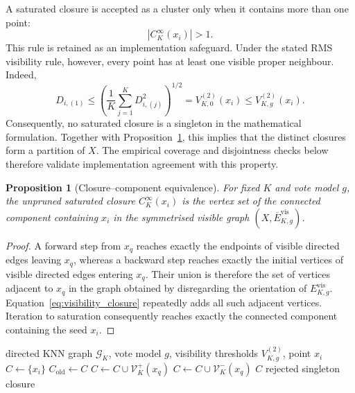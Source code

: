 \documentclass[pdflatex,sn-basic,Numbered]{sn-jnl}
\newtheorem{proposition}[theorem]{Proposition}
\newcommand{\calG}{\mathcal{G}}
\newcommand{\calV}{\mathcal{V}}
\begin{document}
A saturated closure is accepted as a cluster only when it contains more than
one point:
\begin{equation}
|C_K^\infty(x_i)|>1.
\label{eq:singleton_rejection}
\end{equation}
This rule is retained as an implementation safeguard. Under the stated
RMS visibility rule, however, every point has at least one visible proper
neighbour. Indeed,
\begin{equation}
D_{i,(1)}\leq
\left(\frac{1}{K}\sum_{j=1}^{K}D_{i,(j)}^2\right)^{1/2}
=V_{K,0}^{(2)}(x_i)\leq V_{K,g}^{(2)}(x_i).
\label{eq:nonempty_visible_neighbourhood}
\end{equation}
Consequently, no saturated closure is a singleton in the mathematical
formulation. Together with Proposition~\ref{prop:closure_component}, this
implies that the distinct closures form a partition of $X$. The empirical
coverage and disjointness checks below therefore validate implementation
agreement with this property.

\begin{proposition}[Closure--component equivalence]
\label{prop:closure_component}
For fixed $K$ and vote model $g$, the unpruned saturated closure
$C_K^\infty(x_i)$ is the vertex set of the connected component containing
$x_i$ in the symmetrised visible graph
$(X,\overline E^{\mathrm{vis}}_{K,g})$.
\end{proposition}

\begin{proof}
A forward step from $x_q$ reaches exactly the endpoints of visible directed
edges leaving $x_q$, whereas a backward step reaches exactly the initial
vertices of visible directed edges entering $x_q$. Their union is therefore
the set of vertices adjacent to $x_q$ in the graph obtained by disregarding
the orientation of $E^{\mathrm{vis}}_{K,g}$.
Equation~\eqref{eq:visibility_closure} repeatedly adds all such adjacent
vertices. Iteration to saturation consequently reaches exactly the connected
component containing the seed $x_i$.
\end{proof}

\begin{algorithm}[t]
\caption{Visibility-filtered round-trip closure for one point}
\label{alg:visibility_closure}
\begin{algorithmic}[1]
\Require directed KNN graph $\calG_K$, vote model $g$,
visibility thresholds $V_{K,g}^{(2)}$, point $x_i$
\State $C \gets \{x_i\}$
\Repeat
    \State $C_{\mathrm{old}}\gets C$
        \State $C\gets C\cup\calV_K^+(x_q)$
        \State $C\gets C\cup\calV_K^-(x_q)$
    \EndFor
{}
    \State \Return $C$
\Else
    \State \Return rejected singleton closure
\EndIf
\end{algorithmic}
\end{algorithm}
\end{document}
